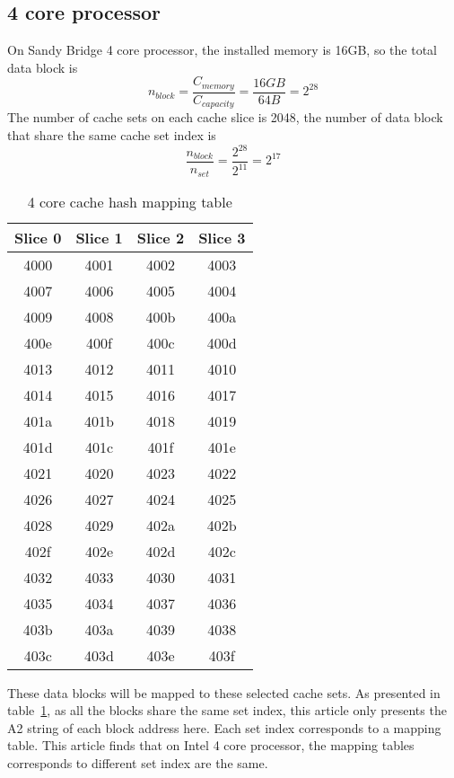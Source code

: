 \documentclass[conference]{IEEEtran}
\newcommand{\WordCapacity}{capacity}
\newcommand{\WordMemory}{memory}
\newcommand{\MemoryCapacity}{C_{\WordMemory}}
\newcommand{\NumberBlock}{n_{block}}
\newcommand{\DataBlockCapacity}{C_{\WordCapacity}}
\newcommand{\NUMSET}{n_{set}}
\newcommand{\SandyBridge}{Sandy Bridge }
\newcommand{\otoprule}{\midrule[\heavyrulewidth]}
\begin{document}
\subsection{4 core processor}
On \SandyBridge 4 core processor, the installed memory is 16GB, so the total data block is 
\begin{equation}
	\NumberBlock = \frac{\MemoryCapacity}{\DataBlockCapacity} = \frac{16 GB}{64 B} = 2^{28}
\end{equation}
The number of cache sets on each cache slice is 2048, the number of data block that share the same cache set index is 
\begin{equation}
	\frac{\NumberBlock}{\NUMSET} = \frac{2^{28}}{2^{11}} = 2^{17}
\end{equation}
\begin{table}[!h]
\centering
\caption{4 core cache hash mapping table}
\label{tab:4CoreHashTable}
\begin{tabular}{cccc} 
	\toprule
Slice 0 & Slice 1 & Slice 2 & Slice 3 \\ \otoprule
4000 & 4001 & 4002 & 4003  \\ \midrule
4007 & 4006 & 4005 & 4004  \\ \midrule
4009 & 4008 & 400b & 400a  \\ \midrule
400e & 400f & 400c & 400d  \\ \midrule
4013 & 4012 & 4011 & 4010  \\ \midrule
4014 & 4015 & 4016 & 4017  \\ \midrule
401a & 401b & 4018 & 4019  \\ \midrule
401d & 401c & 401f & 401e  \\ \midrule
4021 & 4020 & 4023 & 4022  \\ \midrule
4026 & 4027 & 4024 & 4025  \\ \midrule
4028 & 4029 & 402a & 402b  \\ \midrule
402f & 402e & 402d & 402c  \\ \midrule
4032 & 4033 & 4030 & 4031  \\ \midrule
4035 & 4034 & 4037 & 4036  \\ \midrule
403b & 403a & 4039 & 4038  \\ \midrule
403c & 403d & 403e & 403f  \\ 
\bottomrule
\end{tabular}
\end{table}
These data blocks will be mapped to these selected cache sets. As presented in table~\ref{tab:4CoreHashTable}, as all the blocks share the same set index, this article only presents the A2 string of each block address here. 
Each set index corresponds to a mapping table. This article finds that on Intel 4 core processor, the mapping tables corresponds to different set index are the same.
\end{document}
